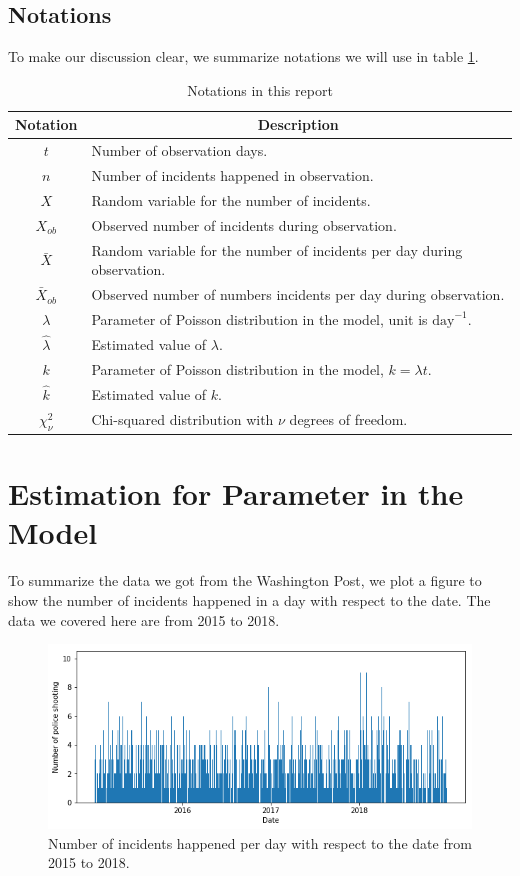 \documentclass[11pt,a4paper,english]{article}
\begin{document}
\subsection{Notations}
To make our discussion clear, we summarize notations we will use in table \ref{tab:notation}.
\begin{table}[htbp]
	\centering
	\begin{tabular}{cl}
		\toprule
		Notation & \multicolumn{1}{c}{Description}\\
		\midrule
		$t$ & Number of observation days.\\
		$n$ & Number of incidents happened in observation.\\
		$X$ & Random variable for the number of incidents.\\
		$X_{ob}$ & Observed number of incidents during observation.\\
		$\bar{X}$ & Random variable for the number of incidents per day during observation.\\
		$\bar{X}_{ob}$ & Observed number of numbers incidents per day during observation.\\
		$\lambda$ & Parameter of Poisson distribution in the model, unit is $\text{day}^{-1}$.\\
		$\hat{\lambda}$ & Estimated value of $\lambda$.\\
		$k$ & Parameter of Poisson distribution in the model, $k = \lambda t$.\\
		$\hat{k}$ & Estimated value of $k$.\\
		$\chi_{\nu}^{2}$ & Chi-squared distribution with $\nu$ degrees of freedom.\\
		\bottomrule
	\end{tabular}
	\caption{Notations in this report}
	\label{tab:notation}
\end{table}

\section{Estimation for Parameter in the Model}
To summarize the data we got from the Washington Post, we plot a figure to show the number of incidents happened in a day with respect to the date. The data we covered here are from 2015 to 2018.
\begin{figure}[htbp]
	\centering
	\includegraphics[width = \textwidth]{1.png}
    \caption{Number of incidents happened per day with respect to the date from 2015 to 2018.}
\end{figure}
\end{document}
